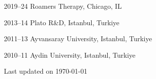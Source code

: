 \documentclass[11pt,letterpaper]{report} %
\begin{document}
    \begin{tablist}

        \item[2019--24] \tab{}Roamers Therapy, Chicago, IL
        \item[2013--14] \tab{}Plato R\&D, Istanbul, Turkiye
        \item[2011--13] \tab{}Ayvansaray University, Istanbul, Turkiye
        \item[2010--11] \tab{}Aydin University, Istanbul, Turkiye

    \end{tablist}



    \begin{center}
        \vfill
        Last updated on \monthyeardate\today
    \end{center}
\end{document}

